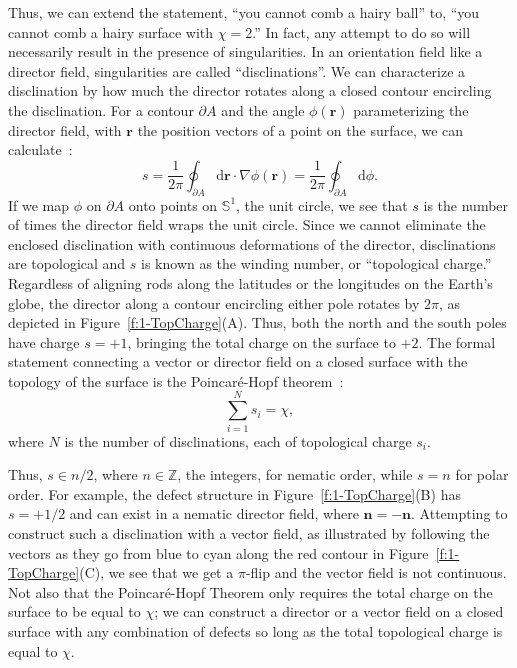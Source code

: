 Thus, we can extend the statement, ``you cannot comb a hairy ball'' to, ``you cannot comb a hairy surface with $\chi=2$.''
In fact, any attempt to do so will necessarily result in the presence of singularities.
In an orientation field like a director field, singularities are called ``disclinations''.
We can characterize a disclination by how much the director rotates along a closed contour encircling the disclination.
For a contour $\partial A$ and the angle $\phi(\mathbf{r})$ parameterizing the director field, with $\mathbf{r}$ the position vectors of a point on the surface, we can calculate~\cite{RN23,RN153,RN203}:
\begin{equation}
  s = \frac{1}{2 \pi}\oint_{\partial A} \textrm{d}\mathbf{r} \cdot \nabla\phi(\mathbf{r}) = \frac{1}{2\pi} \oint_{\partial A} \textrm{d} \phi.\label{eq:1-topCharge}
\end{equation}
If we map $\phi$ on $\partial A$ onto points on $\mathbb{S}^1$, the unit circle, we see that $s$ is the number of times the director field wraps the unit circle.
Since we cannot eliminate the enclosed disclination with continuous deformations of the director, disclinations are topological and $s$ is known as the winding number, or ``topological charge.''
Regardless of aligning rods along the latitudes or the longitudes on the Earth's globe, the director along a contour encircling either pole rotates by $2 \pi$, as depicted in Figure~\ref{f:1-TopCharge}(A).
Thus, both the north and the south poles have charge $s = +1$, bringing the total charge on the surface to $+2$.
The formal statement connecting a vector or director field on a closed surface with the topology of the surface is the Poincar\'e-Hopf theorem~\cite{RN23}:
\begin{equation}
  \sum\limits_{i = 1}^{N} s_i = \chi,\label{e:1-PH}
\end{equation}
where $N$ is the number of disclinations, each of topological charge $s_i$.

Thus, $s \in n/2$, where $n \in \mathbb{Z}$, the integers, for nematic order, while $s = n$ for polar order.
For example, the defect structure in Figure~\ref{f:1-TopCharge}(B) has $s = +1/2$ and can exist in a nematic director field, where $\mathbf{n} = \mathbf{-n}$.
Attempting to construct such a disclination with a vector field, as illustrated by following the vectors as they go from blue to cyan along the red contour in Figure~\ref{f:1-TopCharge}(C), we see that we get a $\pi$-flip and the vector field is not continuous.
Not also that the Poincar\'e-Hopf Theorem only requires the total charge on the surface to be equal to $\chi$; we can construct a director or a vector field on a closed surface with any combination of defects so long as the total topological charge is equal to $\chi$.

